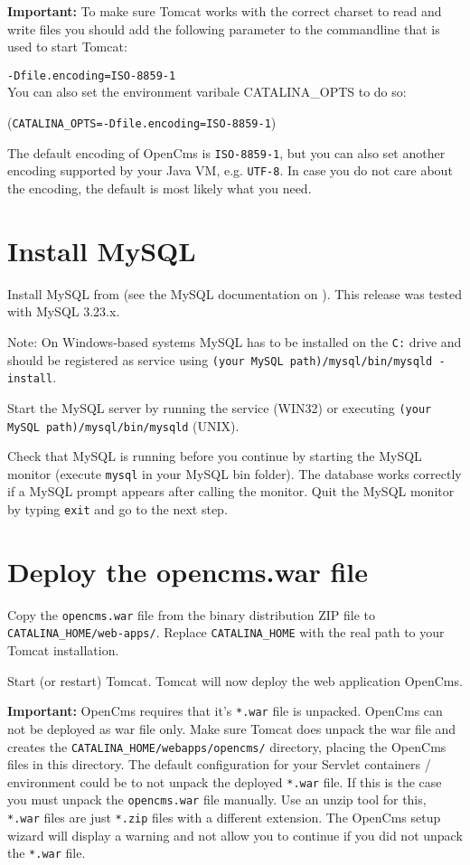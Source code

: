 \textbf{Important:} To make sure Tomcat works with the correct charset to read and
write files you should add the following parameter to the
commandline that is used to start Tomcat:

\texttt{-Dfile.encoding=ISO-8859-1}\\

You can also set the environment varibale CATALINA\_OPTS to do so:

(\texttt{CATALINA\_OPTS=-Dfile.encoding=ISO-8859-1})

The default encoding of OpenCms is \texttt{ISO-8859-1}, 
but you can also set another encoding supported by your Java VM, e.g. \texttt{UTF-8}. 
In case you do not care about the encoding, the default is most likely what you need.

\section{Install MySQL}
Install MySQL from
(see the MySQL documentation on
).
This release was tested with MySQL 3.23.x.

Note: On Windows-based systems MySQL has to be installed on the
\texttt{C:} drive and should be registered as service using
\texttt{(your MySQL path)/mysql/bin/mysqld -install}.

Start the MySQL server by running the service (WIN32) or executing
\texttt{(your MySQL path)/mysql/bin/mysqld} (UNIX).

Check that MySQL is running before you continue by starting the
MySQL monitor (execute \texttt{mysql} in your MySQL bin folder).
The database works correctly if a MySQL prompt appears after
calling the monitor. Quit the MySQL monitor by typing
\texttt{exit} and go to the next step.

\section{Deploy the opencms.war file}
Copy the \texttt{opencms.war} file from the binary distribution ZIP file to
\texttt{CATALINA\_HOME/web-apps/}. Replace
\texttt{CATALINA\_HOME} with the real path to your Tomcat
installation.

Start (or restart) Tomcat. Tomcat will now deploy the web application
OpenCms.

\textbf{Important:} OpenCms requires that it's \texttt{*.war} file is unpacked. 
OpenCms can not be deployed as war file only. 
Make sure Tomcat does unpack the war file and creates the \texttt{CATALINA\_HOME/webapps/opencms/} directory, 
placing the OpenCms files in this directory. 
The default configuration for your Servlet containers / environment could be to not unpack the deployed \texttt{*.war} file. 
If this is the case you must unpack the \texttt{opencms.war} file manually. 
Use an unzip tool for this, \texttt{*.war} files are just \texttt{*.zip} files with a different extension. 
The OpenCms setup wizard will display a warning and not allow you to continue 
if you did not unpack the  \texttt{*.war} file.


